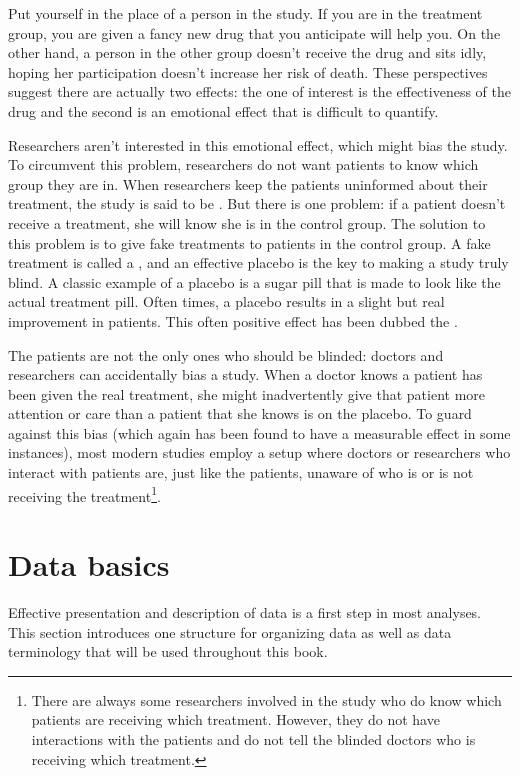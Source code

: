 Put yourself in the place of a person in the study. If you are in the treatment group, you are given a fancy new drug that you anticipate will help you. On the other hand, a person in the other group doesn't receive the drug and sits idly, hoping her participation doesn't increase her risk of death. These perspectives suggest there are actually two effects: the one of interest is the effectiveness of the drug and the second is an emotional effect that is difficult to quantify.

Researchers aren't interested in this emotional effect, which might bias the study. To circumvent this problem, researchers do not want patients to know which group they are in. When researchers keep the patients uninformed about their treatment, the study is said to be . But there is one problem: if a patient doesn't receive a treatment, she will know she is in the control group. The solution to this problem is to give fake treatments to patients in the control group. A fake treatment is called a , and an effective placebo is the key to making a study truly blind. A classic example of a placebo is a sugar pill that is made to look like the actual treatment pill. Often times, a placebo results in a slight but real improvement in patients. This often positive effect has been dubbed the .

The patients are not the only ones who should be blinded: doctors and researchers can accidentally bias a study. When a doctor knows a patient has been given the real treatment, she might inadvertently give that patient more attention or care than a patient that she knows is on the placebo. To guard against this bias (which again has been found to have a measurable effect in some instances), most modern studies employ a  setup where doctors or researchers who interact with patients are, just like the patients, unaware of who is or is not receiving the treatment\footnote{There are always some researchers involved in the study who do know which patients are receiving which treatment. However, they do not have interactions with the patients and do not tell the blinded doctors who is receiving which treatment.}.



\section{Data basics}
\label{dataBasics}

Effective presentation and description of data is a first step in most analyses. This section introduces one structure for organizing data as well as data terminology that will be used throughout this book.

